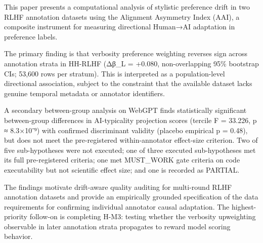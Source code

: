
This paper presents a computational analysis of stylistic preference drift in two RLHF annotation datasets using the Alignment Asymmetry Index (AAI), a composite instrument for measuring directional Human→AI adaptation in preference labels.

The primary finding is that verbosity preference weighting reverses sign across annotation strata in HH-RLHF (Δβ_L = +0.080, non-overlapping 95\% bootstrap CIs; 53,600 rows per stratum). This is interpreted as a population-level directional association, subject to the constraint that the available dataset lacks genuine temporal metadata or annotator identifiers.

A secondary between-group analysis on WebGPT finds statistically significant between-group differences in AI-typicality projection scores (tercile F = 33.226, p ≈ 8.3×10⁻⁹) with confirmed discriminant validity (placebo empirical p = 0.48), but does not meet the pre-registered within-annotator effect-size criterion. Two of five sub-hypotheses were not executed; one of three executed sub-hypotheses met its full pre-registered criteria; one met MUST_WORK gate criteria on code executability but not scientific effect size; and one is recorded as PARTIAL.

The findings motivate drift-aware quality auditing for multi-round RLHF annotation datasets and provide an empirically grounded specification of the data requirements for confirming individual annotator causal adaptation. The highest-priority follow-on is completing H-M3: testing whether the verbosity upweighting observable in later annotation strata propagates to reward model scoring behavior.

